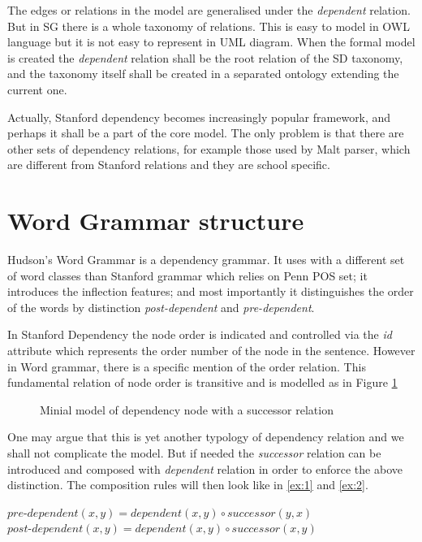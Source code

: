 \documentclass[11pt,a4paper,titlepage]{article}
\begin{document}
The edges or relations in the model are generalised under the \textit{dependent} relation. But in SG there is a whole taxonomy of relations. This is easy to model in OWL language but it is not easy to represent in UML diagram. When the formal model is created the \textit{dependent} relation shall be the root relation of the SD taxonomy, and the taxonomy itself shall be created in a separated ontology extending the current one. 

Actually, Stanford dependency becomes increasingly popular framework, and perhaps it shall be a part of the core model. The only problem is that there are other sets of dependency relations, for example those used by Malt parser, which are different from Stanford relations and they are school specific. 

\section{Word Grammar structure}
\label{sec:wgs}
Hudson's Word Grammar is a dependency grammar. It uses with a different set of word classes than Stanford grammar which relies on Penn POS set; it introduces the inflection features; and most importantly it distinguishes the order of the words by distinction \textit{post-dependent} and \textit{pre-dependent}. 

In Stanford Dependency the node order is indicated and controlled via the \textit{id} attribute which represents the order number of the node in the sentence. However in Word grammar, there is a specific mention of the order relation. This fundamental relation of node order is transitive and is modelled as in Figure \ref{fig:mode-dep-successor}

\begin{figure}[H]
	\centering
	\label{fig:mode-dep-successor}
	\caption{Minial model of dependency node with a successor relation}
\end{figure}


One may argue that this is yet another typology of dependency relation and we shall not complicate the model. But if needed the \textit{successor} relation can be introduced and composed with \textit{dependent} relation in order to enforce the above distinction. The composition rules will then look like in \ref{ex:1} and \ref{ex:2}.
\begin{exe}
	\ex\label{ex:1} $pre\text{-}dependent(x,y) = dependent(x,y) \circ successor(y,x)$
	\ex\label{ex:2} $post\text{-}dependent(x,y) = dependent(x,y) \circ successor(x,y)$
\end{exe}
\end{document}
